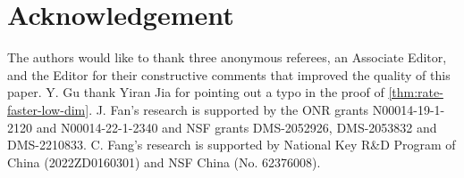 \documentclass[10pt]{article}
\numberwithin{equation}{section}
\begin{document}
\section*{Acknowledgement}
The authors would like to thank three anonymous referees, an Associate Editor, and the Editor for their constructive comments that improved the quality of this paper. Y. Gu thank Yiran Jia for pointing out a typo in the proof of \cref{thm:rate-faster-low-dim}. J. Fan's research is supported by the ONR grants N00014-19-1-2120 and N00014-22-1-2340 and NSF grants DMS-2052926, DMS-2053832 and DMS-2210833. C. Fang's research is supported by National Key R\&D Program of China (2022ZD0160301) and NSF China (No. 62376008).




\newpage
\end{document}

